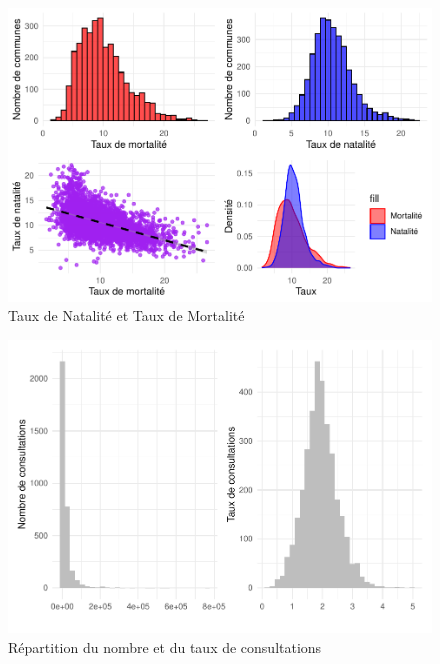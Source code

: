 \begin{figure}

{\centering \includegraphics{4_Analyse_Descriptive_files/figure-latex/unnamed-chunk-5-1} 

}

\caption{Taux de Natalité et Taux de Mortalité}\label{fig:unnamed-chunk-5}
\end{figure}

\begin{figure}

{\centering \includegraphics{4_Analyse_Descriptive_files/figure-latex/unnamed-chunk-6-1} 

}

\caption{Répartition du nombre et du taux de consultations}\label{fig:unnamed-chunk-6}
\end{figure}


